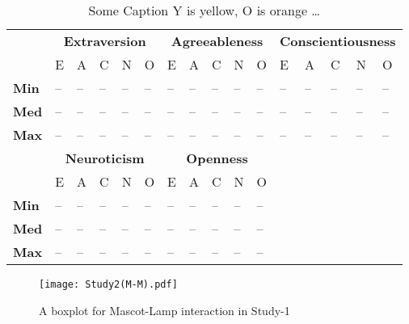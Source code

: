 \begin{table}[H]
    \renewcommand{\arraystretch}{1.2}
    \caption{Some Caption Y is yellow, O is orange \ldots}
    \label{table:medianMM2}
    \begin{center}
        \begin{tabular}{p{}|
        p{}|p{}|p{}|p{}|p{}||
        p{}|p{}|p{}|p{}|p{}||
        p{}|p{}|p{}|p{}|p{}|}
            \cline{2-16}
            & \multicolumn{5}{c||}{\textbf{Extraversion}} & \multicolumn{5}{c||}{\textbf{Agreeableness}}
            & \multicolumn{5}{c|}{\textbf{Conscientiousness}} \\
            \cline{2-16}
            & E & A & C & N & O  			    & E & A & C & N & O   	 	& E & A & C & N & O      \\
            \cline{2-16}
            \textbf{Min}  	& -- & -- & -- & -- & -- 		& -- & -- & -- & -- & --  	& -- & -- & -- & -- & --  \\
            \textbf{Med} 	& -- & -- & -- & -- & -- 		& -- & -- & -- & -- & --  	& -- & -- & -- & -- & --  \\
            \textbf{Max}	& -- & -- & -- & -- & -- 		& -- & -- & -- & -- & --  	& -- & -- & -- & -- & -- \\
            \cline{2-16}
            \cline{2-11}
            &  \multicolumn{5}{|c||}{\textbf{Neuroticism}} & \multicolumn{5}{|c||}{\textbf{Openness}} \\
            \cline{2-11}
            & E & A & C & N & O  			& E & A & C & N & O     		\\
            \cline{2-11}
            \textbf{Min} 	& -- & -- & -- & -- & -- 		& -- & -- & -- & -- & -- 	\\
            \textbf{Med}    & -- & -- & -- & -- & -- 	    & -- & -- & -- & -- & -- 	\\
            \textbf{Max}  	& -- & -- & -- & -- & -- 		& -- & -- & -- & -- & --  	\\
            \cline{2-11}
        \end{tabular}
    \end{center}
\end{table}

\begin{figure}[H]
    \centering
    \texttt{[image: Study2(M-M).pdf]}
    \caption{A boxplot for Mascot-Lamp interaction in Study-1}
    \label{fig:MM2}
\end{figure}

